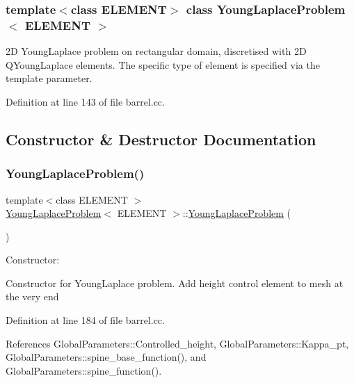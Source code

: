 \subsubsection*{template$<$class E\+L\+E\+M\+E\+NT$>$\newline
class Young\+Laplace\+Problem$<$ E\+L\+E\+M\+E\+N\+T $>$}

2D Young\+Laplace problem on rectangular domain, discretised with 2D Q\+Young\+Laplace elements. The specific type of element is specified via the template parameter. 

Definition at line 143 of file barrel.\+cc.



\subsection{Constructor \& Destructor Documentation}
\mbox{\label{classYoungLaplaceProblem_a4ea552f351994849e9ab597ef2da797a}} 
\subsubsection{\texorpdfstring{Young\+Laplace\+Problem()}{YoungLaplaceProblem()}\hspace{0.1cm}{\footnotesize\ttfamily [1/2]}}
{\footnotesize\ttfamily template$<$class E\+L\+E\+M\+E\+NT $>$ \\
\hyperlink{classYoungLaplaceProblem}{Young\+Laplace\+Problem}$<$ E\+L\+E\+M\+E\+NT $>$\+::\hyperlink{classYoungLaplaceProblem}{Young\+Laplace\+Problem} (\begin{DoxyParamCaption}{ }\end{DoxyParamCaption})}



Constructor\+: 

Constructor for Young\+Laplace problem. Add height control element to mesh at the very end 

Definition at line 184 of file barrel.\+cc.



References Global\+Parameters\+::\+Controlled\+\_\+height, Global\+Parameters\+::\+Kappa\+\_\+pt, Global\+Parameters\+::spine\+\_\+base\+\_\+function(), and Global\+Parameters\+::spine\+\_\+function().

